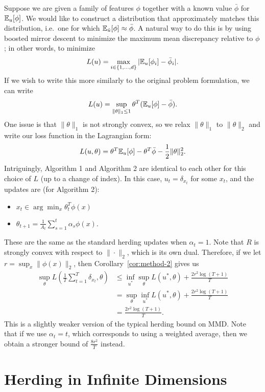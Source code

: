 \documentclass{article}
\begin{document}
Suppose we are given a family of features $\phi$ together 
with a known value $\bar{\phi}$ for $\mathbb{E}_{u}[\phi]$. We 
would like to construct a distribution that approximately 
matches this distribution, i.e.~one for which 
$\mathbb{E}_{\hat{u}}[\phi] \approx \bar{\phi}$. A natural way 
to do this is by using boosted mirror descent to minimize the 
maximum mean discrepancy relative to $\phi$; 
in other words, to minimize
\[ L(u) = \max_{i \in \{1,\dots,d\}} |\mathbb{E}_{u}[\phi_i]-\bar{\phi}_i|. \]
If we wish to write this more similarly to the original problem 
formulation, we can write
\[ L(u) = \sup_{\|\theta\|_1 \leq 1} \theta^T(\mathbb{E}_{u}[\phi]-\bar{\phi}). \]
One issue is that $\|\theta\|_1$ is not strongly convex, so we relax $\|\theta\|_1$ 
to $\|\theta\|_2$ and write our loss function in the Lagrangian form:
\[ L(u, \theta) = \theta^T\mathbb{E}_{u}[\phi] - \theta^T\bar{\phi} - \frac{1}{2}\|\theta\|_2^2. \]
Intriguingly, Algorithm 1 and Algorithm 2 are identical to each other for this choice of $L$ 
(up to a change of index). In this case, $u_t = \delta_{x_t}$ for some $x_t$, and 
the updates are (for Algorithm 2):
\begin{itemize}
\item $x_t \in \arg\min_{x} \theta_t^T\phi(x)$
\item $\theta_{t+1} = \frac{1}{A_t} \sum_{s=1}^t \alpha_s \phi(x)$.
\end{itemize}
These are the same as the standard herding updates when 
$\alpha_t = 1$. Note that $R$ is strongly convex with respect to 
$\|\cdot\|_2$, which is its own dual. Therefore, if we let
$r = \sup_{x} \|\phi(x)\|_2$, then Corollary~\ref{cor:method-2} gives us
\begin{align*}
\sup_{\theta} L\left(\frac{1}{T} \sum_{t=1}^T \delta_{x_t}, \theta\right) &\leq \inf_{u^*} \sup_{\theta} L(u^*, \theta) + \frac{2r^2\log(T+1)}{T} \\
 &= \sup_{\theta} \inf_{u^*} L(u^*, \theta) + \frac{2r^2\log(T+1)}{T} \\
 &= \frac{2r^2\log(T+1)}{T}.
\end{align*}
This is a slightly weaker version of the typical herding bound on MMD.
Note that if we use $\alpha_t = t$, which corresponds to using a weighted 
average, then we obtain a stronger bound of $\frac{8r^2}{T}$ instead.

\section{Herding in Infinite Dimensions}
\label{sec:infinite-case}
\end{document}
